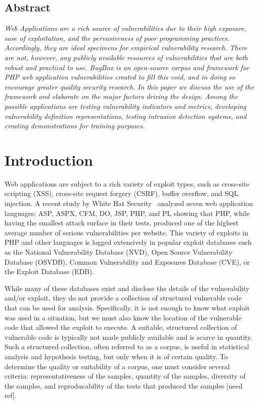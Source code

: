 \documentclass[letterpaper,twocolumn,10pt]{article}
\begin{document}


\subsection*{Abstract}
\textit{
Web Applications are a rich source of vulnerabilities due to their high exposure, ease of exploitation, and the pervasiveness of poor programming practices. Accordingly, they are ideal specimens for \emph{empirical vulnerability research}. There are not, however, any publicly available resources of vulnerabilities that are both robust and practical to use. BugBox is an open-source corpus and framework for PHP web application vulnerabilities created to fill this void, and in doing so encourage greater quality security research. In this paper we discuss the use of the framework and elaborate on the major factors driving the design. Among the possible applications are testing vulnerability indicators and metrics, developing vulnerability definition representations, testing intrusion detection systems, and creating demonstrations for training purposes.  
}

\section{Introduction}
Web applications are subject to a rich variety of exploit types, such as cross-site scripting (XSS), cross-site request forgery (CSRF), buffer overflow, and SQL injection.  A recent study by White Hat Security~\cite{WhiteHat:2010:Online} analyzed seven web application languages: ASP, ASPX, CFM, DO, JSP, PHP, and PL showing that PHP, while having the smallest attack surface in their tests, produced one of the highest average number of serious vulnerabilities per website.  This variety of exploits in PHP and other languages is logged extensively in popular exploit databases such as the National Vulnerability Database (NVD), Open Source Vulnerability Database (OSVDB), Common Vulnerability and Exposures Database (CVE), or the Exploit Database (EDB).\par

While many of these databases exist and disclose the details of the vulnerability and/or exploit, they do not provide a collection of structured vulnerable code that can be used for analysis.  Specifically, it is not enough to know what exploit was used in a situation, but we must also know the location of the vulnerable code that allowed the exploit to execute.  A suitable, structured collection of vulnerable code is typically not made publicly available and is scarce in quantity.  Such a structured collection, often referred to as a corpus, is useful in statistical analysis and hypothesis testing, but only when it is of certain quality.  To determine the quality or suitability of a corpus, one must consider several criteria: representativeness of the samples, quantity of the samples, diversity of the samples, and reproducability of the tests that produced the samples [need ref].\par
\end{document}
